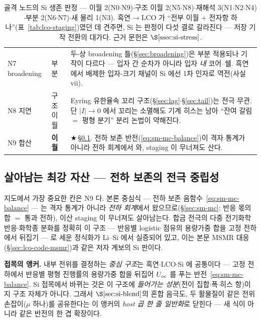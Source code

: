 \begin{table}[h]
\begin{tabular}{p{} p{} p{}}
N7 broadening & 부분 & 두-상 broadening 틀(\S\ref{sec:broadening})은 부분 적용되나 기작이 다르다 --- 입자 간 순차가 아니라 입자 \emph{내} 코어--쉘. 흑연에서 배제한 입자-크기 채널이 Si 에선 1차 인자로 역전(사실 vii). \\
N8 지연 & 구조 이월 & Eyring 유한율속 꼬리 구조(\S\ref{sec:lag}$\cdot$\S\ref{sec:tail})는 전극 무관. 단 $|I|\!\to\!0$ 에서 꼬리는 소멸해도 기계 히스는 남아 ``잔여 갈림 $=$ 평형 분기'' 분리 논법이 약해진다. \\
N9 합산 & \textbf{이월} & $\bigstar$\,\S\ref{ssec:si-carry}. 전하 보존 반전(\eqref{eq:sm-mc-balance})이 격자 통계가 아니라 전하 회계에서 와, staging 이 무너져도 산다. \\
\bottomrule
\end{tabular}
\caption{골격 노드의 Si 생존 판정 --- 이월 2(N0$\cdot$N9)$\cdot$구조 이월 2(N5$\cdot$N8)$\cdot$재해석
3(N1$\cdot$N2$\cdot$N4)$\cdot$부분 2(N6$\cdot$N7)$\cdot$새 물리 1(N3). 흑연$\to$LCO 가 ``전부 이월 $+$
전자항 하나''(표~\ref{tab:lco-staging})였던 데 견주면, Si 는 판정이 다섯 결로 갈라진다 --- 저장 기작
전환의 대가다. 근거 문헌은 $\S\ref{ssec:si-stress}$.}
\label{tab:si-survival}
\end{table}

\subsection{살아남는 최강 자산 --- 전하 보존의 전극 중립성}\label{ssec:si-carry}
지도에서 가장 중요한 칸은 N9 다. 본론 중심식 --- 전하 보존 음함수~\eqref{eq:sm-mc-balance} --- 는 격자
통계가 아니라 \emph{전하 회계}에서 왔으므로(\S\ref{sec:sm-mc}: 반응 몫의 합 $=$ 통과 전하), 이산 staging
이 무너져도 살아남는다. 합금 전극의 다중 전기화학 반응$\cdot$화학종 분화를 정확히 이 구조 --- 반응별
logistic 점유의 용량가중 합을 고정 전하에서 뒤집기 --- 로 세운 정식화가 Li--Si 에서 실증되어
있고\cite{verbrugge_lisi2016}, 이는 본문 MSMR 대응(\S\ref{sec:lco-code-msmr})과 같은 저자 계보의 Si 판이다.

\begin{keybox}
\textbf{접목의 앵커.} 내부 전위를 결정하는 \emph{중심 구조}는 흑연$\cdot$LCO$\cdot$Si 에 공통이다 ---
고정 전하에서 반응별 평형 진행률의 용량가중 합을 뒤집어 $U_{\mathrm{oc}}$ 를 푸는
반전~\eqref{eq:sm-mc-balance}. Si 접목에서 바뀌는 것은 이 구조에 \emph{들어가는 성분}(전이
집합$\cdot$폭$\cdot$히스 항)이지 구조 자체가 아니다. 그래서 $\S\ref{sec:si-blend}$의 혼합 음극도, 두
활물질이 같은 전위 손잡이($\mu$ 하나)를 공유한다는 이 앵커의 \emph{host 곱 한 줄 일반화}로 닫힌다 ---
새 식이 아니라 같은 반전의 한 겹 확장이다.
\end{keybox}

